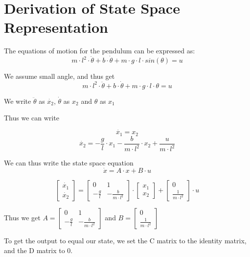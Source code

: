 \documentclass[a4paper,12pt,english]{article}
\author{Stefan Ravn van Overeem – stvan13@student.sdu.dk}
\begin{document}
\maketitle
\newpage

\section{Derivation of State Space Representation}
The equations of motion for the pendulum can be expressed as:
$$m \cdot  l^2  \cdot \ddot{\theta} + b  \cdot \dot{\theta} + m  \cdot g  \cdot l  \cdot sin(\theta) = u$$

We assume small angle, and thus get
$$m \cdot  l^2  \cdot \ddot{\theta} + b  \cdot \dot{\theta} + m  \cdot g  \cdot l  \cdot \theta = u$$


We write $\ddot{\theta}$ as $\dot{x_2}$,
$\dot{\theta}$ as $x_2$
and $\theta$ as $x_1$

Thus we can write

$$\dot{x_1} = x_2$$
$$\dot{x_2} = -\frac{g}{l} \cdot x_1 - \frac{b}{m \cdot l^2} \cdot x_2 + \frac{u}{m \cdot l^2}$$

We can thus write the state space equation
$$\dot{x} = A \cdot x + B \cdot u$$

$$
\begin{bmatrix}
\dot{x_1} \\
\dot{x_2}
\end{bmatrix}
=
\begin{bmatrix}
	0 & 1 \\
	-\frac{g}{l} & -\frac{b}{m \cdot l^2}
\end{bmatrix}
\cdot
\begin{bmatrix}
x_1 \\
x_2
\end{bmatrix}
+
\begin{bmatrix}
0 \\
\frac{1}{m \cdot l^2}
\end{bmatrix}
\cdot u
$$

Thus we get
$
A = \begin{bmatrix}
	0 & 1 \\
	-\frac{g}{l} & -\frac{b}{m \cdot l^2}
\end{bmatrix}
$
and
$
B = \begin{bmatrix}
0 \\
\frac{1}{m \cdot l^2}
\end{bmatrix}
$

To get the output to equal our state, we set the C matrix to the identity matrix, and the D matrix to 0.
\end{document}
